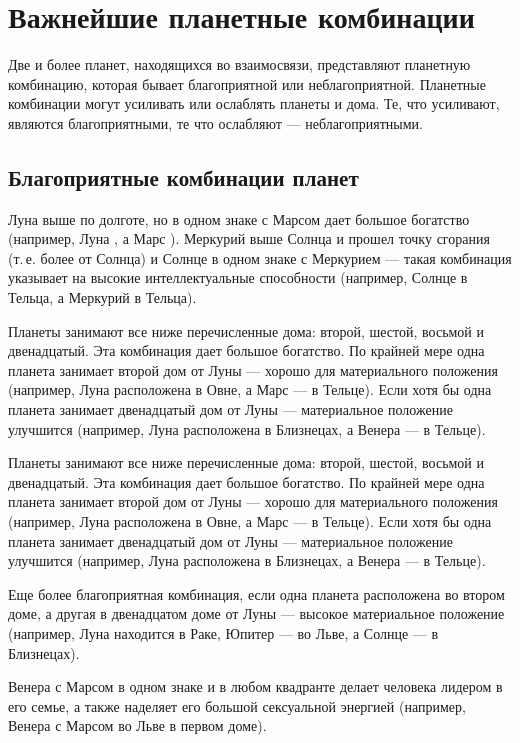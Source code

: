 \section{Важнейшие планетные комбинации}

Две и более планет, находящихся во взаимосвязи, представляют планетную комбинацию, которая бывает благоприятной или неблагоприятной. Планетные комбинации могут усиливать или ослаблять планеты и дома. Те, что усиливают, являются благоприятными, те что ослабляют --- неблагоприятными.

\subsection*{Благоприятные комбинации планет}

Луна выше по долготе, но в одном знаке с Марсом дает большое богатство (например, Луна , а Марс ). Меркурий выше Солнца и прошел точку сгорания (т.\,е. более  от Солнца) и Солнце в одном знаке с Меркурием --- такая комбинация указывает на высокие интеллектуальные способности (например, Солнце в  Тельца, а Меркурий в  Тельца).

Планеты занимают все ниже перечисленные дома: второй, шестой, восьмой и двенадцатый. Эта комбинация дает большое богатство. По крайней мере одна планета занимает второй дом от Луны --- хорошо для материального положения (например, Луна расположена в Овне, а Марс --- в Тельце). Если хотя бы одна планета занимает двенадцатый дом от Луны --- материальное положение улучшится (например, Луна расположена в Близнецах, а Венера --- в Тельце).



Планеты занимают все ниже перечисленные дома: второй, шестой, восьмой и двенадцатый. Эта комбинация дает большое богатство. По крайней мере одна планета занимает второй дом от Луны --- хорошо для материального положения (например, Луна расположена в Овне, а Марс --- в Тельце). Если хотя бы одна планета занимает двенадцатый дом от Луны --- материальное положение улучшится (например, Луна расположена в Близнецах, а Венера --- в Тельце).

Еще более благоприятная комбинация, если одна планета расположена во втором доме, а другая в двенадцатом доме от Луны --- высокое материальное положение (например, Луна находится в Раке, Юпитер --- во Льве, а Солнце --- в Близнецах).

Венера с Марсом в одном знаке и в любом квадранте делает человека лидером в его семье, а также наделяет его большой сексуальной энергией (например, Венера с Марсом во Льве в первом доме).

